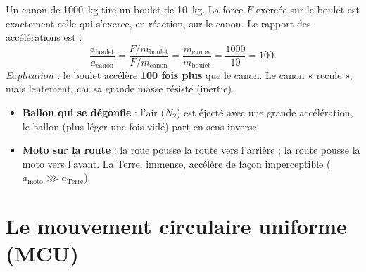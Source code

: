 \documentclass[11pt,a4paper]{article}
\newcommand{\vv}[1]{\vec{#1}}
\begin{document}
\begin{center}
\end{center}

\begin{exemple}
Un canon de \qty{1000}{\kilogram} tire un boulet de \qty{10}{\kilogram}. La force $F$ exercée sur le
boulet est exactement celle qui s'exerce, en réaction, sur le canon. Le rapport des accélérations
est :
\[ \frac{a_{\text{boulet}}}{a_{\text{canon}}}=\frac{F/m_{\text{boulet}}}{F/m_{\text{canon}}}
   =\frac{m_{\text{canon}}}{m_{\text{boulet}}}=\frac{1000}{10}=100. \]
\emph{Explication :} le boulet accélère \textbf{100 fois plus} que le canon. Le canon « recule »,
mais lentement, car sa grande masse résiste (inertie).
\end{exemple}

\begin{exemple}
\begin{itemize}[leftmargin=1.6em,topsep=2pt,itemsep=1pt]
  \item \textbf{Ballon qui se dégonfle} : l'air ($N_2$) est éjecté avec une grande accélération, le ballon (plus léger une fois vidé) part en sens inverse.
  \item \textbf{Moto sur la route} : la roue pousse la route vers l'arrière ; la route pousse la moto vers l'avant. La Terre, immense, accélère de façon imperceptible ($a_{\text{moto}}\ggg a_{\text{Terre}}$).
\end{itemize}
\end{exemple}

\section{Le mouvement circulaire uniforme (MCU)}
\end{document}
